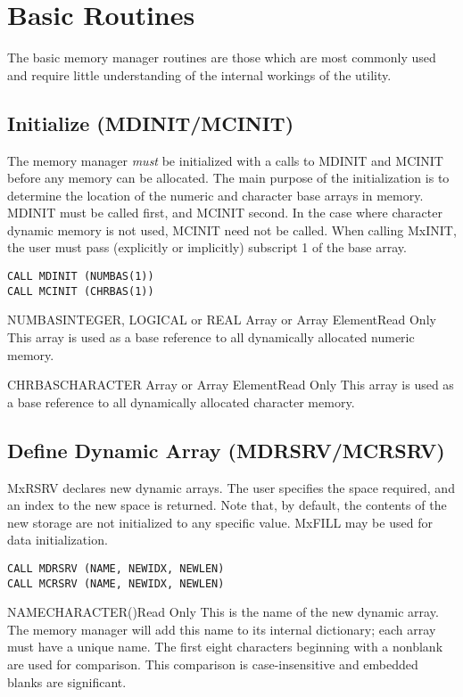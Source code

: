 \section{Basic Routines}\label{sec:mbas}
The basic memory manager routines are those which are most commonly used and
require little understanding of the internal workings of the utility.

\subsection{Initialize (MDINIT/MCINIT)}
The memory manager {\em must} be initialized with a calls to MDINIT and
MCINIT before any memory can be allocated.  The main purpose of the
initialization is to determine the location of the numeric and character
base arrays in memory. MDINIT must be called first, and MCINIT second. In
the case where character dynamic memory is not used, MCINIT need not be
called. When calling MxINIT, the user must pass (explicitly or
implicitly) subscript 1 of the base array. 
\begin{verbatim}
CALL MDINIT (NUMBAS(1))
CALL MCINIT (CHRBAS(1))
\end{verbatim}

\begin{argy}{NUMBAS}{INTEGER, LOGICAL or REAL Array or Array Element}{Read
Only}
This array is used as a base reference to all dynamically allocated
numeric memory.
\end{argy}

\begin{argy}{CHRBAS}{CHARACTER Array or Array Element}{Read Only}
This array is used as a base reference to all dynamically allocated
character memory.
\end{argy}

\subsection{Define Dynamic Array (MDRSRV/MCRSRV)}
MxRSRV declares new dynamic arrays.  The user specifies the space
required, and an index to the new space is returned.  Note that, by
default, the contents of the new storage are not initialized to any specific
value. MxFILL may be used for data initialization. 
\begin{verbatim}
CALL MDRSRV (NAME, NEWIDX, NEWLEN)
CALL MCRSRV (NAME, NEWIDX, NEWLEN)
\end{verbatim}

\begin{argy}{NAME}{CHARACTER\last(\last)}{Read Only}
This is the name of the new dynamic array. The memory manager will add this
name to its internal dictionary; each array must have a unique name.  The
first eight characters beginning with a nonblank are
used for comparison.
This comparison is case-insensitive and embedded blanks are
significant.
\end{argy}

